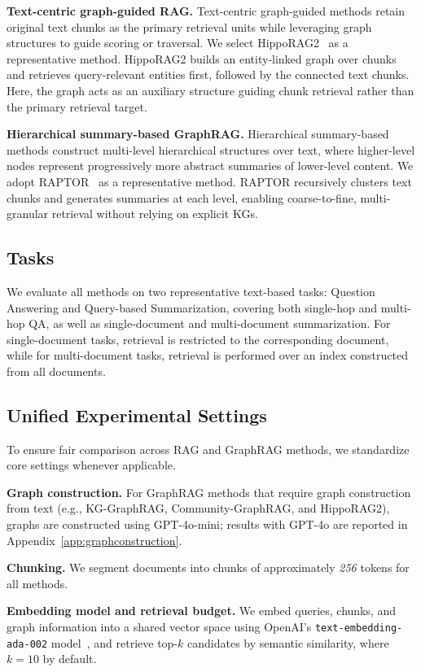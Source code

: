 \noindent \textbf{Text-centric graph-guided RAG.}
Text-centric graph-guided methods retain original text chunks as the primary retrieval units while leveraging graph structures to guide scoring or traversal. 
We select HippoRAG2~\cite{gutierrez2025rag} as a representative method. 
HippoRAG2 builds an entity-linked graph over chunks and retrieves query-relevant entities first, followed by the connected text chunks. 
Here, the graph acts as an auxiliary structure guiding chunk retrieval rather than the primary retrieval target.

\noindent \textbf{Hierarchical summary-based GraphRAG.}
Hierarchical summary-based methods construct multi-level hierarchical structures over text, where higher-level nodes represent progressively more abstract summaries of lower-level content. 
We adopt RAPTOR~\cite{sarthi2024raptor} as a representative method. 
RAPTOR recursively clusters text chunks and generates summaries at each level, enabling coarse-to-fine, multi-granular retrieval without relying on explicit KGs.

\subsection{Tasks}
We evaluate all methods on two representative text-based tasks: Question Answering and Query-based Summarization, covering both single-hop and multi-hop QA, as well as single-document and multi-document summarization. For single-document tasks, retrieval is restricted to the corresponding document, while for multi-document tasks, retrieval is performed over an index constructed from all documents.

\subsection{Unified Experimental Settings}
To ensure fair comparison across RAG and GraphRAG methods, we standardize core settings whenever applicable.

\noindent \textbf{Graph construction.}
For GraphRAG methods that require graph construction from text (e.g., KG-GraphRAG, Community-GraphRAG, and HippoRAG2), graphs are constructed using GPT-4o-mini; results with GPT-4o are reported in Appendix~\ref{app:graphconstruction}.

\noindent \textbf{Chunking.}
We segment documents into chunks of approximately \textit{256} tokens for all methods.

\noindent \textbf{Embedding model and retrieval budget.}
We embed queries, chunks, and graph information into a shared vector space using OpenAI's \texttt{text-embedding-ada-002} model~\cite{nussbaum2024nomic}, and retrieve top-$k$ candidates by semantic similarity, where $k{=}10$ by default. 

